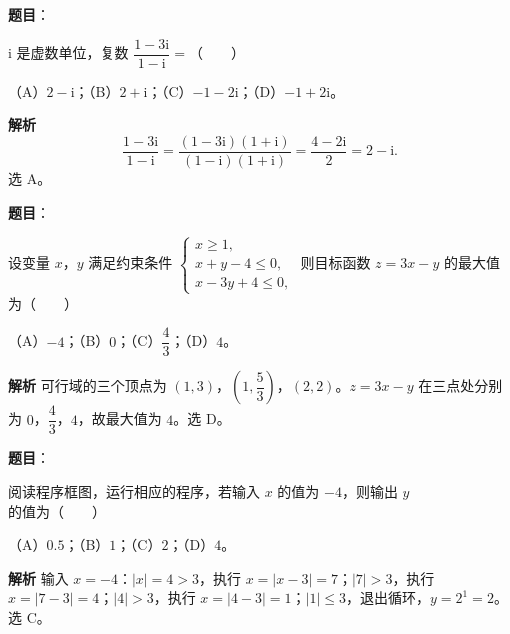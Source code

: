 
\begin{answer}

\textbf{题目}：

$\mathrm i$ 是虚数单位，复数 $\dfrac{1-3\mathrm i}{1-\mathrm i}=$\mbox{（　　）}

（A）$2-\mathrm i$；（B）$2+\mathrm i$；（C）$-1-2\mathrm i$；（D）$-1+2\mathrm i$。

\textbf{解析}
\nopagebreak[4]
\[\frac{1-3\mathrm i}{1-\mathrm i}=\frac{(1-3\mathrm i)(1+\mathrm i)}{(1-\mathrm i)(1+\mathrm i)}=\frac{4-2\mathrm i}2=2-\mathrm i.\]
选 A。


\end{answer}
\begin{answer}

\textbf{题目}：

设变量 $x$，$y$ 满足约束条件 $\begin{cases}x\geqslant1,\\ x+y-4\leqslant0,\\ x-3y+4\leqslant0,\end{cases}$ 则目标函数 $z=3x-y$ 的最大值为\mbox{（　　）}

（A）$-4$；（B）$0$；（C）$\dfrac43$；（D）$4$。

\textbf{解析}
可行域的三个顶点为 $(1,3)$，$\left(1,\dfrac53\right)$，$(2,2)$。$z=3x-y$ 在三点处分别为 $0$，$\dfrac43$，$4$，故最大值为 $4$。选 D。


\end{answer}
\begin{answer}

\textbf{题目}：

阅读程序框图，运行相应的程序，若输入 $x$ 的值为 $-4$，则输出 $y$ 的值为\mbox{（　　）}
\nopagebreak[4]
\begin{center}\end{center}
\nopagebreak[4]
（A）$0.5$；（B）$1$；（C）$2$；（D）$4$。

\textbf{解析}
输入 $x=-4$：$|x|=4>3$，执行 $x=|x-3|=7$；$|7|>3$，执行 $x=|7-3|=4$；$|4|>3$，执行 $x=|4-3|=1$；$|1|\leqslant3$，退出循环，$y=2^1=2$。选 C。


\end{answer}

